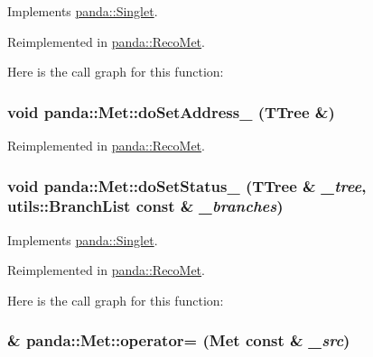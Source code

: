 Implements \hyperlink{classpanda_1_1Singlet_ad5acaa19bf3a8c360cf2e36604ab4530}{panda::Singlet}.

Reimplemented in \hyperlink{classpanda_1_1RecoMet_a264ac3eeeaf567babde8c3847317bcc9}{panda::RecoMet}.

Here is the call graph for this function:\hypertarget{classpanda_1_1Met_aa3d27a3592eefcbd69ff73c6c8e70112}{
\subsubsection[{doSetAddress\_\-}]{\setlength{\rightskip}{0pt plus 5cm}void panda::Met::doSetAddress\_\- (TTree \&)}}
\label{classpanda_1_1Met_aa3d27a3592eefcbd69ff73c6c8e70112}


Reimplemented in \hyperlink{classpanda_1_1RecoMet_a6b54b0213c71dc2208c24bae6f709e2c}{panda::RecoMet}.\hypertarget{classpanda_1_1Met_a3ed51e1633313fa1fb5f5dbda38108c8}{
\subsubsection[{doSetStatus\_\-}]{\setlength{\rightskip}{0pt plus 5cm}void panda::Met::doSetStatus\_\- (TTree \& {\em \_\-tree}, \/  {\bf utils::BranchList} const \& {\em \_\-branches})}}
\label{classpanda_1_1Met_a3ed51e1633313fa1fb5f5dbda38108c8}


Implements \hyperlink{classpanda_1_1Singlet_a660799e379f7949f3b8e2d74f6e1ddb2}{panda::Singlet}.

Reimplemented in \hyperlink{classpanda_1_1RecoMet_ada709eee42912be17dc1575083bc5f99}{panda::RecoMet}.

Here is the call graph for this function:\hypertarget{classpanda_1_1Met_a75a8d56e25e884dfd9bdeff20b3d0b61}{
\subsubsection[{operator=}]{ \& panda::Met::operator= ({\bf Met} const \& {\em \_\-src})}}
\label{classpanda_1_1Met_a75a8d56e25e884dfd9bdeff20b3d0b61}


